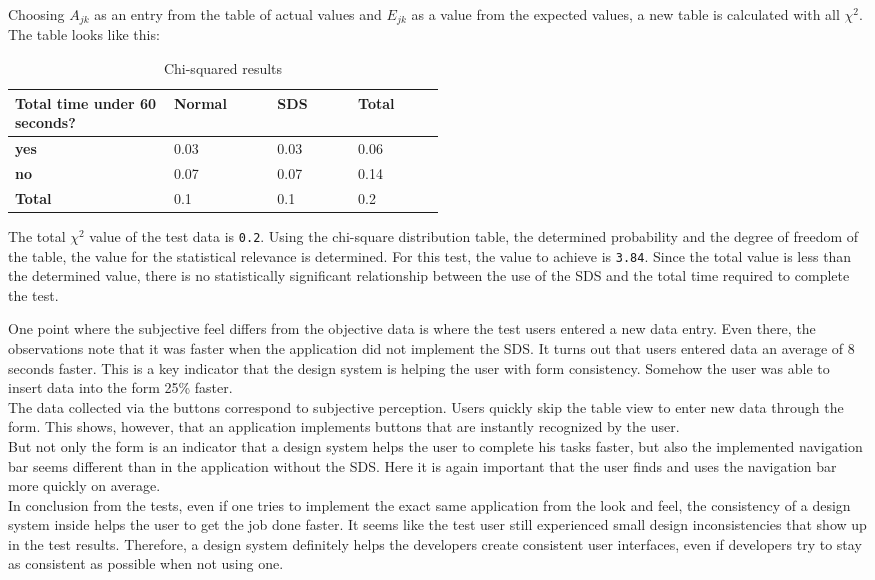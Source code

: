 Choosing $A_{jk}$ as an entry from the table of actual values and $E_{jk}$ as a value from the expected values, a new table is calculated with all $\chi^2$. The table looks like this:
\begin{table}[ht]
    \centering
    \begin{tabular}{|p{0.2\linewidth} || p{0.1\linewidth}|p{0.1\linewidth}|p{0.1\linewidth}|}
        \hline
        \textbf{Total time under 60 seconds?} &\textbf{Normal}&\textbf{\ac{SDS}}&\textbf{Total} \\ \hline\hline
        \textbf{yes} & 0.03 & 0.03 & 0.06 \\ \hline
        \textbf{no} & 0.07 & 0.07 & 0.14 \\ \hline
        \textbf{Total} & 0.1 & 0.1 & 0.2 \\ \hline
    \end{tabular}
    \caption{\label{tab:chi-square-results} Chi-squared results}
\end{table}
The total $\chi^2$ value of the test data is \texttt{0.2}. Using the chi-square distribution table, the determined probability and the degree of freedom of the table, the value for the statistical relevance is determined. For this test, the value to achieve is \texttt{3.84}. Since the total value is less than the determined value, there is no statistically significant relationship between the use of the SDS and the total time required to complete the test.

One point where the subjective feel differs from the objective data is where the test users entered a new data entry. Even there, the observations note that it was faster when the application did not implement the SDS. It turns out that users entered data an average of 8 seconds faster. This is a key indicator that the design system is helping the user with form consistency. Somehow the user was able to insert data into the form 25\% faster. \\
The data collected via the buttons correspond to subjective perception. Users quickly skip the table view to enter new data through the form. This shows, however, that an application implements buttons that are instantly recognized by the user. \\
But not only the form is an indicator that a design system helps the user to complete his tasks faster, but also the implemented navigation bar seems different than in the application without the \ac{SDS}. Here it is again important that the user finds and uses the navigation bar more quickly on average. \\

In conclusion from the tests, even if one tries to implement the exact same application from the look and feel, the consistency of a design system inside helps the user to get the job done faster. It seems like the test user still experienced small design inconsistencies that show up in the test results. Therefore, a design system definitely helps the developers create consistent user interfaces, even if developers try to stay as consistent as possible when not using one.
